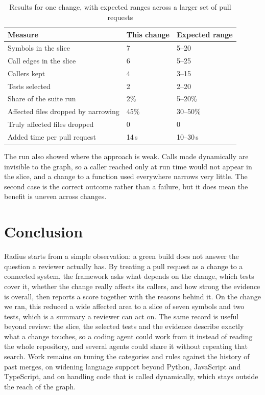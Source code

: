\documentclass[conference]{IEEEtran}
\begin{document}
\begin{table}[t]
\caption{Results for one change, with expected ranges across a larger set of pull requests}
\label{tab:results}
\centering
\small
\begin{tabular}{@{}p{3.6cm}p{1.3cm}p{1.8cm}@{}}
\toprule
\textbf{Measure} & \textbf{This change} & \textbf{Expected range} \\
\midrule
Symbols in the slice & 7 & 5--20 \\
Call edges in the slice & 6 & 5--25 \\
Callers kept & 4 & 3--15 \\
Tests selected & 2 & 2--20 \\
Share of the suite run & 2\% & 5--20\% \\
Affected files dropped by narrowing & 45\% & 30--50\% \\
Truly affected files dropped & 0 & 0 \\
Added time per pull request & 14\,s & 10--30\,s \\
\bottomrule
\end{tabular}
\end{table}

The run also showed where the approach is weak. Calls made dynamically are invisible to the graph, so a caller reached only at run time would not appear in the slice, and a change to a function used everywhere narrows very little. The second case is the correct outcome rather than a failure, but it does mean the benefit is uneven across changes.

\section{Conclusion}
\label{sec:conclusion}

Radius starts from a simple observation: a green build does not answer the question a reviewer actually has. By treating a pull request as a change to a connected system, the framework asks what depends on the change, which tests cover it, whether the change really affects its callers, and how strong the evidence is overall, then reports a score together with the reasons behind it. On the change we ran, this reduced a wide affected area to a slice of seven symbols and two tests, which is a summary a reviewer can act on. The same record is useful beyond review: the slice, the selected tests and the evidence describe exactly what a change touches, so a coding agent could work from it instead of reading the whole repository, and several agents could share it without repeating that search. Work remains on tuning the categories and rules against the history of past merges, on widening language support beyond Python, JavaScript and TypeScript, and on handling code that is called dynamically, which stays outside the reach of the graph.



\end{document}
